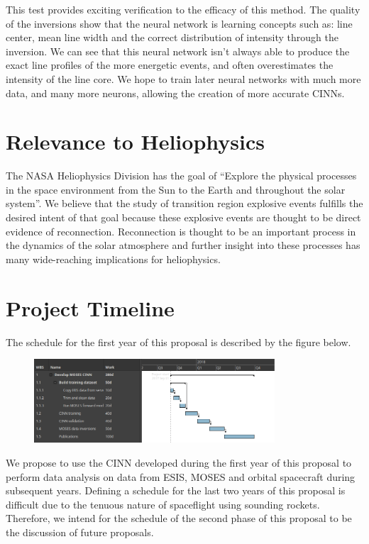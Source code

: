 \documentclass[10pt, letter]{article}
\begin{document}
			This test provides exciting verification to the efficacy of this method. The quality of the inversions show that the neural network is learning concepts such as: line center, mean line width and the correct distribution of intensity through the inversion. We can see that this neural network isn't always able to produce the exact line profiles of the more energetic events, and often overestimates the intensity of the line core. We hope to train later neural networks with much more data, and many more neurons, allowing the creation of more accurate CINNs.
		
	\section{Relevance to Heliophysics}
	
		The NASA Heliophysics Division has the goal of ``Explore the physical processes in the space environment from the Sun to the Earth and throughout the solar system''. We believe that the study of transition region explosive events fulfills the desired intent of that goal because these explosive events are thought to be direct evidence of reconnection. Reconnection is thought to be an important process in the dynamics of the solar atmosphere and further insight into these processes has many wide-reaching implications for heliophysics.
	
	\section{Project Timeline}
		The schedule for the first year of this proposal is described by the figure below.
		\begin{figure}[h!]
			\centering
			\includegraphics[width=0.8\textwidth]{figures/schedule}
		\end{figure}
		
		We propose to use the CINN developed during the first year of this proposal to perform data analysis on data from ESIS, MOSES and orbital spacecraft during subsequent years. Defining a schedule for the last two years of this proposal is difficult due to the tenuous nature of spaceflight using sounding rockets. Therefore, we intend for the schedule of the second phase of this proposal to be the discussion of future proposals.

	\printbibliography

	
	
	
	
	
	
	
\end{document}
